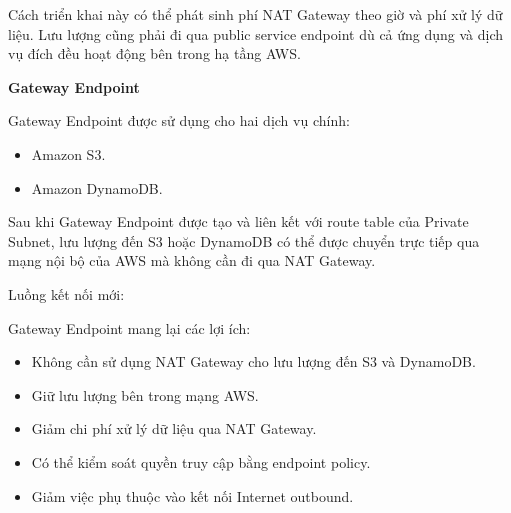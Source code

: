 \begin{Shaded}
\begin{Highlighting}[]
\NormalTok{      |}
\NormalTok{      |}
\end{Highlighting}
\end{Shaded}

Cách triển khai này có thể phát sinh phí NAT Gateway theo giờ và phí xử
lý dữ liệu. Lưu lượng cũng phải đi qua public service endpoint dù cả ứng
dụng và dịch vụ đích đều hoạt động bên trong hạ tầng AWS.

\vspace{0.5em}\noindent\textbf{Gateway Endpoint}\par

Gateway Endpoint được sử dụng cho hai dịch vụ chính:

\begin{itemize}
\tightlist
\item
  Amazon S3.
\item
  Amazon DynamoDB.
\end{itemize}

Sau khi Gateway Endpoint được tạo và liên kết với route table của
Private Subnet, lưu lượng đến S3 hoặc DynamoDB có thể được chuyển trực
tiếp qua mạng nội bộ của AWS mà không cần đi qua NAT Gateway.

Luồng kết nối mới:

\begin{Shaded}
\begin{Highlighting}[]
\NormalTok{      |}
\NormalTok{      |}
\end{Highlighting}
\end{Shaded}

Gateway Endpoint mang lại các lợi ích:

\begin{itemize}
\tightlist
\item
  Không cần sử dụng NAT Gateway cho lưu lượng đến S3 và DynamoDB.
\item
  Giữ lưu lượng bên trong mạng AWS.
\item
  Giảm chi phí xử lý dữ liệu qua NAT Gateway.
\item
  Có thể kiểm soát quyền truy cập bằng endpoint policy.
\item
  Giảm việc phụ thuộc vào kết nối Internet outbound.
\end{itemize}

